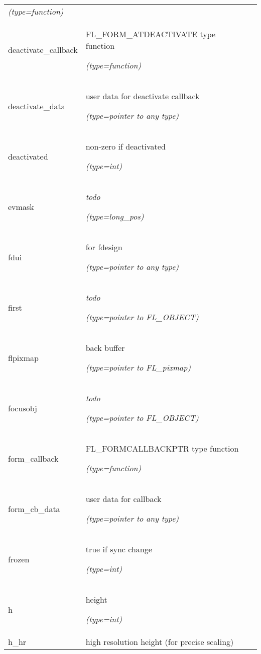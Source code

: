 \begin{longtable}{|p{\varnamewidth}|p{\vardescrwidth}|l}
            {\it (type=function)}&\\
\cline{1-2}
\raggedright d\-e\-a\-c\-t\-i\-v\-a\-t\-e\-\_\-c\-a\-l\-l\-b\-a\-c\-k\- & \raggedright FL\_FORM\_ATDEACTIVATE type function

            {\it (type=function)}&\\
\cline{1-2}
\raggedright d\-e\-a\-c\-t\-i\-v\-a\-t\-e\-\_\-d\-a\-t\-a\- & \raggedright user data for deactivate callback

            {\it (type=pointer to any type)}&\\
\cline{1-2}
\raggedright d\-e\-a\-c\-t\-i\-v\-a\-t\-e\-d\- & \raggedright non-zero if deactivated

            {\it (type=int)}&\\
\cline{1-2}
\raggedright e\-v\-m\-a\-s\-k\- & \raggedright \emph{todo}

            {\it (type=long\_pos)}&\\
\cline{1-2}
\raggedright f\-d\-u\-i\- & \raggedright for fdesign

            {\it (type=pointer to any type)}&\\
\cline{1-2}
\raggedright f\-i\-r\-s\-t\- & \raggedright \emph{todo}

            {\it (type=pointer to FL\_OBJECT)}&\\
\cline{1-2}
\raggedright f\-l\-p\-i\-x\-m\-a\-p\- & \raggedright back buffer

            {\it (type=pointer to FL\_pixmap)}&\\
\cline{1-2}
\raggedright f\-o\-c\-u\-s\-o\-b\-j\- & \raggedright \emph{todo}

            {\it (type=pointer to FL\_OBJECT)}&\\
\cline{1-2}
\raggedright f\-o\-r\-m\-\_\-c\-a\-l\-l\-b\-a\-c\-k\- & \raggedright FL\_FORMCALLBACKPTR type function

            {\it (type=function)}&\\
\cline{1-2}
\raggedright f\-o\-r\-m\-\_\-c\-b\-\_\-d\-a\-t\-a\- & \raggedright user data for callback

            {\it (type=pointer to any type)}&\\
\cline{1-2}
\raggedright f\-r\-o\-z\-e\-n\- & \raggedright true if sync change

            {\it (type=int)}&\\
\cline{1-2}
\raggedright h\- & \raggedright height

            {\it (type=int)}&\\
\cline{1-2}
\raggedright h\-\_\-h\-r\- & \raggedright high resolution height (for precise scaling)


\end{longtable}
